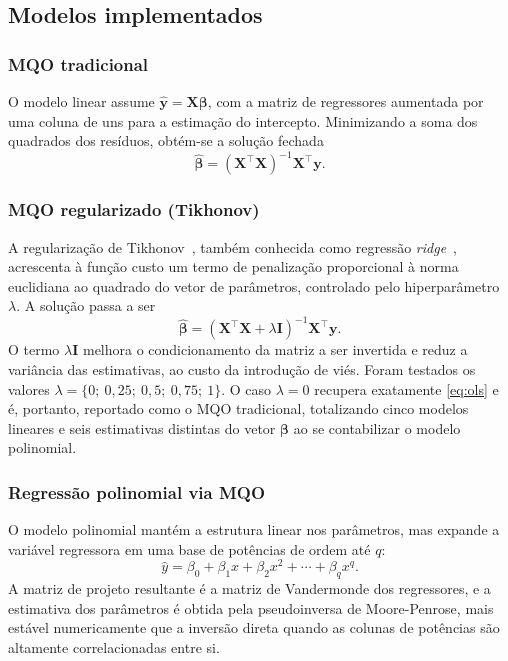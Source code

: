 \documentclass[conference]{IEEEtran}
\begin{document}
\subsection{Modelos implementados}
\label{sec:reg-modelos}

\subsubsection{MQO tradicional}

O modelo linear assume $\hat{\mathbf{y}} = \mathbf{X}\boldsymbol{\beta}$, com a
matriz de regressores aumentada por uma coluna de uns para a estimação do
intercepto. Minimizando a soma dos quadrados dos resíduos, obtém-se a solução
fechada
\begin{equation}
\hat{\boldsymbol{\beta}} = (\mathbf{X}^{\top}\mathbf{X})^{-1}\mathbf{X}^{\top}\mathbf{y}.
\label{eq:ols}
\end{equation}

\subsubsection{MQO regularizado (Tikhonov)}

A regularização de Tikhonov~\cite{b1}, também conhecida como regressão
\textit{ridge}~\cite{b2}, acrescenta à função custo um termo de penalização
proporcional à norma euclidiana ao quadrado do vetor de parâmetros, controlado
pelo hiperparâmetro $\lambda$. A solução passa a ser
\begin{equation}
\hat{\boldsymbol{\beta}} = (\mathbf{X}^{\top}\mathbf{X} + \lambda \mathbf{I})^{-1}\mathbf{X}^{\top}\mathbf{y}.
\label{eq:ridge}
\end{equation}
O termo $\lambda \mathbf{I}$ melhora o condicionamento da matriz a ser invertida
e reduz a variância das estimativas, ao custo da introdução de viés. Foram
testados os valores $\lambda = \{0;\ 0{,}25;\ 0{,}5;\ 0{,}75;\ 1\}$. O caso
$\lambda = 0$ recupera exatamente \eqref{eq:ols} e é, portanto, reportado como o
MQO tradicional, totalizando cinco modelos lineares e seis estimativas distintas
do vetor $\boldsymbol{\beta}$ ao se contabilizar o modelo polinomial.

\subsubsection{Regressão polinomial via MQO}

O modelo polinomial mantém a estrutura linear nos parâmetros, mas expande a
variável regressora em uma base de potências de ordem até $q$:
\begin{equation}
\hat{y} = \beta_0 + \beta_1 x + \beta_2 x^2 + \cdots + \beta_q x^q.
\label{eq:poly}
\end{equation}
A matriz de projeto resultante é a matriz de Vandermonde dos regressores, e a
estimativa dos parâmetros é obtida pela pseudoinversa de Moore-Penrose, mais
estável numericamente que a inversão direta quando as colunas de potências são
altamente correlacionadas entre si.
\end{document}
